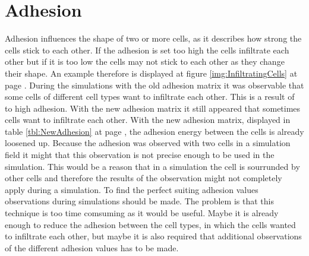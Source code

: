 \section{Adhesion}
Adhesion influences the shape of two or more cells, as it describes how strong the cells stick to each other. If the adhesion is set too high the cells infiltrate each other but if it is too low the cells may not stick to each other as they change their shape. An example therefore is displayed at figure \ref{img:InfiltratingCells} at page \pageref{img:InfiltratingCells}. During the simulations with the old adhesion matrix it was observable that some cells of different cell types want to infiltrate each other. This is a result of to high adhesion. With the new adhesion matrix it still appeared that sometimes cells want to infiltrate each other. With the new adhesion matrix, displayed in table \ref{tbl:NewAdhesion} at page \pageref{tbl:NewAdhesion}, the adhesion energy between the cells is already loosened up. Because the adhesion was observed with two cells in a simulation field it might that this observation is not precise enough to be used in the simulation. This would be a reason that in a simulation the cell is sourrunded by other cells and therefore the results of the observation might not completely apply during a simulation. To find the perfect suiting adhesion values observations during simulations should be made. The problem is that this technique is too time comsuming as it would be useful. Maybe it is already enough to reduce the adhesion between the cell types, in which the cells wanted to infiltrate each other, but maybe it is also required that additional observations of the different adhesion values has to be made.

